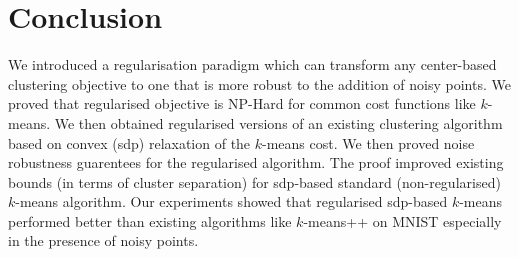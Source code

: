 \documentclass[12pt]{article}
\begin{document}
\section{Conclusion}
We introduced a regularisation paradigm which can transform any center-based clustering objective to one that is more robust to the addition of noisy points.  We proved that regularised objective is NP-Hard for common cost functions like $k$-means. We then obtained regularised versions of an existing clustering algorithm based on convex (sdp) relaxation of the $k$-means cost. We then proved noise robustness guarentees for the regularised algorithm. The proof improved existing bounds (in terms of cluster separation) for sdp-based standard (non-regularised) $k$-means algorithm. Our experiments showed that regularised sdp-based $k$-means performed better than existing algorithms like $k$-means++ on MNIST especially in the presence of noisy points.
 

\ifdefined\COMPLETE
\else
\end{document}
